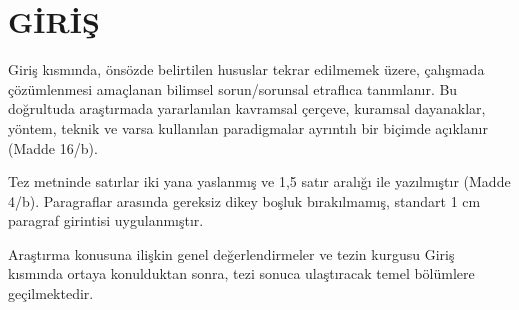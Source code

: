 \chapter*{GİRİŞ}

Giriş kısmında, önsözde belirtilen hususlar tekrar edilmemek üzere, çalışmada çözümlenmesi amaçlanan bilimsel sorun/sorunsal etraflıca tanımlanır. Bu doğrultuda araştırmada yararlanılan kavramsal çerçeve, kuramsal dayanaklar, yöntem, teknik ve varsa kullanılan paradigmalar ayrıntılı bir biçimde açıklanır (Madde 16/b).

Tez metninde satırlar iki yana yaslanmış ve 1,5 satır aralığı ile yazılmıştır (Madde 4/b). Paragraflar arasında gereksiz dikey boşluk bırakılmamış, standart 1 cm paragraf girintisi uygulanmıştır. 

Araştırma konusuna ilişkin genel değerlendirmeler ve tezin kurgusu Giriş kısmında ortaya konulduktan sonra, tezi sonuca ulaştıracak temel bölümlere geçilmektedir.

